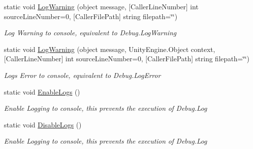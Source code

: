 \begin{DoxyCompactItemize}
static void \mbox{\hyperlink{class_s_u_t_log_manager_a3a440d408789e18d9d98c23be1109d97}{Log\+Warning}} (object message, \mbox{[}Caller\+Line\+Number\mbox{]} int source\+Line\+Number=0, \mbox{[}Caller\+File\+Path\mbox{]} string filepath=\char`\"{}\char`\"{})
\begin{DoxyCompactList}\small\item\em Log Warning to console, equivalent to Debug.\+Log\+Warning \end{DoxyCompactList}\item 
static void \mbox{\hyperlink{class_s_u_t_log_manager_ae55b8669d4549670220c65ec6125a46a}{Log\+Warning}} (object message, Unity\+Engine.\+Object context, \mbox{[}Caller\+Line\+Number\mbox{]} int source\+Line\+Number=0, \mbox{[}Caller\+File\+Path\mbox{]} string filepath=\char`\"{}\char`\"{})
\begin{DoxyCompactList}\small\item\em Logs Error to console, equivalent to Debug.\+Log\+Error \end{DoxyCompactList}\item 
static void \mbox{\hyperlink{class_s_u_t_log_manager_a5493cf91256613ca690ed94a977647ff}{Enable\+Logs}} ()
\begin{DoxyCompactList}\small\item\em Enable Logging to console, this prevents the execution of Debug.\+Log \end{DoxyCompactList}\item 
static void \mbox{\hyperlink{class_s_u_t_log_manager_aefe5c2647d1f89847c677317b0106fb4}{Disable\+Logs}} ()
\begin{DoxyCompactList}\small\item\em Enable Logging to console, this prevents the execution of Debug.\+Log \end{DoxyCompactList}\end{DoxyCompactItemize}
